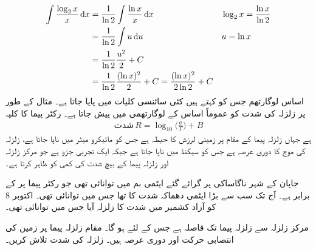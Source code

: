 \begin{align*}
\int\frac{\log_2x}{x}\dif x&=\frac{1}{\ln 2}\int\frac{\ln x}{x}\dif x&&\log_2x=\frac{\ln x}{\ln 2}\\
&=\frac{1}{\ln 2}\int u\dif u&&u=\ln x\\
&=\frac{1}{\ln 2}\frac{u^2}{2}+C\\
&=\frac{1}{\ln 2}\frac{(\ln x)^2}{2}+C=\frac{(\ln x)^2}{2\ln 2}+C
\end{align*}
اساس  لوگارتھم جس کو  کہتے ہیں کئی سائنسی کلیات میں پایا جاتا ہے۔ مثال کے طور پر زلزلہ کی شدت کو عموماً اساس  کے  لوگارتھمی  میں پیش جاتا ہے۔ رکٹر پیما کا کلیہ 
\begin{align*}
\text{شدت}\, R=\log_{10}\big(\frac{a}{T}\big)+B
\end{align*}
ہے جہاں زلزلہ پیما کے مقام پر زمینی لرزش کا حیطہ  ہے جس کو مائیکرو میٹر میں ناپا جاتا ہے، زلزلہ کی موج کا دوری عرصہ  ہے جس کو سیکنڈ میں ناپا جاتا ہے جبکہ  ایک تجربی جزو ہے جو مرکز زلزلہ اور زلزلہ پیما کے بیچ شدت کی کمی کو ظاہر کرتا ہے۔ 

جاپان کے شہر ناگاساکی پر گرائے  گئے ایٹمی بم میں   توانائی تھی جو رکٹر پیما پر  کے برابر ہے۔  آج تک سب سے بڑا ایٹمی دھماکہ  شدت کا تھا جس میں  توانائی تھی۔  اکتوبر 8  کو آزاد کشمیر میں  شدت کا زلزلہ آیا جس میں  توانائی تھی۔

مرکز زلزلہ سے زلزلہ پیما تک فاصلہ  ہے جس کے لئے  ہو گا۔ مقام زلزلہ پیما پر زمین کی انتصابی حرکت  اور دوری عرصہ  ہیں۔ زلزلہ کی شدت تلاش کریں۔

